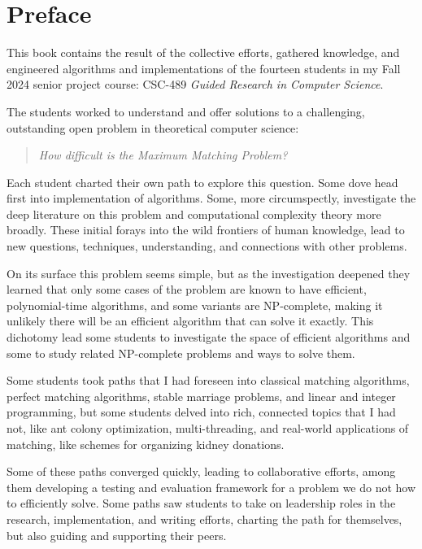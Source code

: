 \def\changemargin#1#2{\list{}{\rightmargin#2\leftmargin#1}\item[]}
\let\endchangemargin=\endlist 

\begin{changemargin}{0.75in}{0.75in}

\section*{Preface}

This book contains the result of the collective efforts, gathered
knowledge, and engineered algorithms and implementations of the
fourteen students in my Fall 2024 senior project course: CSC-489
\emph{Guided Research in Computer Science}.

The students worked to understand and offer solutions to a
challenging, outstanding open problem in theoretical computer science:
\begin{quote}
\begin{center}
    \emph{How difficult is the Maximum Matching Problem?}
\end{center}
\end{quote}
Each student charted their own path to explore this question.  Some
dove head first into implementation of algorithms.  Some, more
circumspectly, investigate the deep literature on this problem and
computational complexity theory more broadly.  These initial forays
into the wild frontiers of human knowledge, lead to new questions,
techniques, understanding, and connections with other problems.

On its surface this problem seems simple, but as the investigation
deepened they learned that only some cases of the problem are known to
have efficient, polynomial-time algorithms, and some variants are
NP-complete, making it unlikely there will be an efficient algorithm
that can solve it exactly.  This dichotomy lead some students to
investigate the space of efficient algorithms and some to study
related NP-complete problems and ways to solve them.

Some students took paths that I had foreseen into classical matching
algorithms, perfect matching algorithms, stable marriage problems, and
linear and integer programming, but some students delved into rich,
connected topics that I had not, like ant colony optimization,
multi-threading, and real-world applications of matching, like schemes
for organizing kidney donations.

Some of these paths converged quickly, leading to collaborative
efforts, among them developing a testing and evaluation framework for
a problem we do not how to efficiently solve.  Some paths saw students
to take on leadership roles in the research, implementation, and
writing efforts, charting the path for themselves, but also guiding
and supporting their peers.


\end{changemargin}

